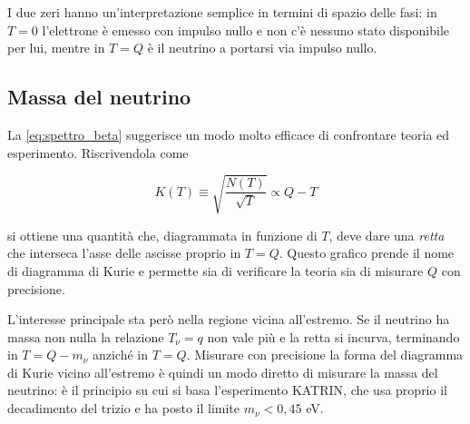 \begin{figure}[htbp]
\centering
{}
\label{fig:spettro_beta}
\end{figure}

 I due zeri hanno un'interpretazione semplice in termini di spazio delle fasi: in $T = 0$ l'elettrone è emesso con impulso nullo e non c'è nessuno stato disponibile per lui, mentre in $T = Q$ è il neutrino a portarsi via impulso nullo. 

\subsection*{Massa del neutrino}

 La \eqref{eq:spettro_beta} suggerisce un modo molto efficace di confrontare teoria ed esperimento. Riscrivendola come
%
\begin{tcolorbox}[colback=black!5!white, colframe=black!45!white, boxrule=0.8pt]
\begin{equation}
    K(T) \equiv \sqrt{\frac{N(T)}{\sqrt{T}}} \propto Q - T
\end{equation}
\end{tcolorbox}
si ottiene una quantità che, diagrammata in funzione di $T$, deve dare una \emph{retta} che interseca l'asse delle ascisse proprio in $T = Q$. Questo grafico prende il nome di diagramma di Kurie e permette sia di verificare la teoria sia di misurare $Q$ con precisione. 

L'interesse principale sta però nella regione vicina all'estremo. Se il neutrino ha massa non nulla la relazione $T_{\nu} = q$ non vale più e la retta si incurva, terminando in $T = Q - m_{\nu}$ anziché in $T = Q$. Misurare con precisione la forma del diagramma di Kurie vicino all'estremo è quindi un modo diretto di misurare la massa del neutrino: è il principio su cui si basa l'esperimento KATRIN, che usa proprio il decadimento del trizio e ha posto il limite $m_{\nu} < 0,45$ eV. 

